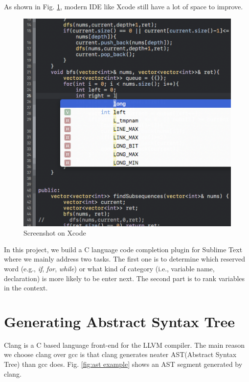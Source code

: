\documentclass[prodmode,acmtecs]{acmsmall} %
\begin{document}
As shown in Fig. \ref{fig:xcode}, modern IDE like Xcode still have a lot of space to improve. 

\begin{figure}
\centerline{\includegraphics[width=1.0\textwidth]{xcode}}
\caption{Screenshot on Xcode}
\label{fig:xcode}
\end{figure}


In this project, we build a C language code completion plugin for Sublime Text where we mainly address two tasks. The first one is to determine which reserved word (e.g., {\it if}, {\it for}, {\it while}) or what kind of category (i.e., variable name, declaration) is more likely to be enter next. The second part is to rank variables in the context.



\section{Generating Abstract Syntax Tree}
Clang is a C based language front-end for the LLVM compiler\cite{lattner2004llvm}. The main reason we choose clang over gcc is that clang generates neater AST(Abstract Syntax Tree) than gcc does. Fig. \ref{fig:ast example} shows an AST segment generated by clang. 
\end{document}
